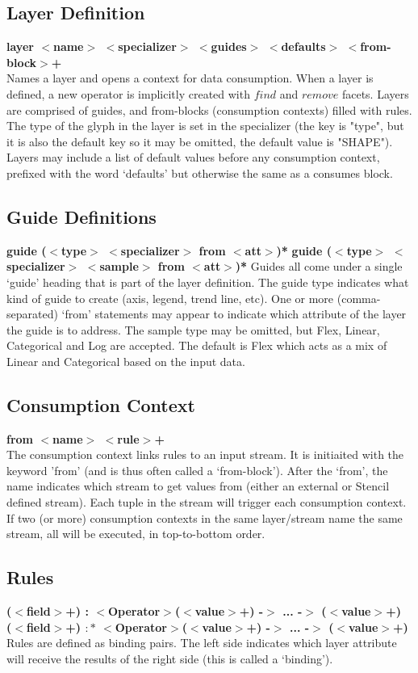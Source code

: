 \documentclass{article}
\begin{document}
\subsection{Layer Definition}
\textbf{layer $<$name$>$  $<$specializer$>$ $<$guides$>$ $<$defaults$>$ $<$from-block$>$+}\\
Names a layer and opens a context for data consumption.  
When a layer is defined, a new operator is implicitly created with $find$ and $remove$ facets.
Layers are comprised of guides, and from-blocks (consumption contexts) filled with rules. 
The type of the glyph in the layer is set in the specializer (the key is "type", but it is also the default key so it may be omitted, the default value is "SHAPE").
Layers may include a list of default values before any consumption context, prefixed with the word `defaults' but otherwise the same as a consumes block.

\subsection{Guide Definitions}
\textbf{guide ($<$type$>$ $<$specializer$>$ from $<$att$>$)*}
\textbf{guide ($<$type$>$ $<$specializer$>$ $<$sample$>$ from $<$att$>$)*}
Guides all come under a single `guide' heading that is part of the layer definition.
The guide type indicates what kind of guide to create (axis, legend, trend line, etc).
One or more (comma-separated) `from' statements may appear to indicate which attribute of the layer the guide is to address.
The sample type  may be omitted, but Flex, Linear, Categorical and Log are accepted.
The default is Flex which acts as a mix of Linear and Categorical based on the input data.

\subsection{Consumption Context}
\textbf{from $<$name$>$ $<$rule$>$+}\\
The consumption context links rules to an input stream.  It is initiaited with the keyword 'from' (and is thus often called a `from-block').
After the `from', the name indicates which stream to get values from (either an external or Stencil defined stream).
Each tuple in the stream will trigger each consumption context.  
If two (or more) consumption contexts in the same layer/stream name the same stream, all will be executed, in top-to-bottom order.

\subsection{Rules}
\textbf{($<$field$>$+) : $<$Operator$>$($<$value$>$+) -$>$ ... -$>$ ($<$value$>$+)}\\
\textbf{($<$field$>$+) $:*$ $<$Operator$>$($<$value$>$+) -$>$ ... -$>$ ($<$value$>$+)}\\
Rules are defined as binding pairs.  
The left side indicates which layer attribute will receive the results of the right side (this is called a `binding'). 
\end{document}
